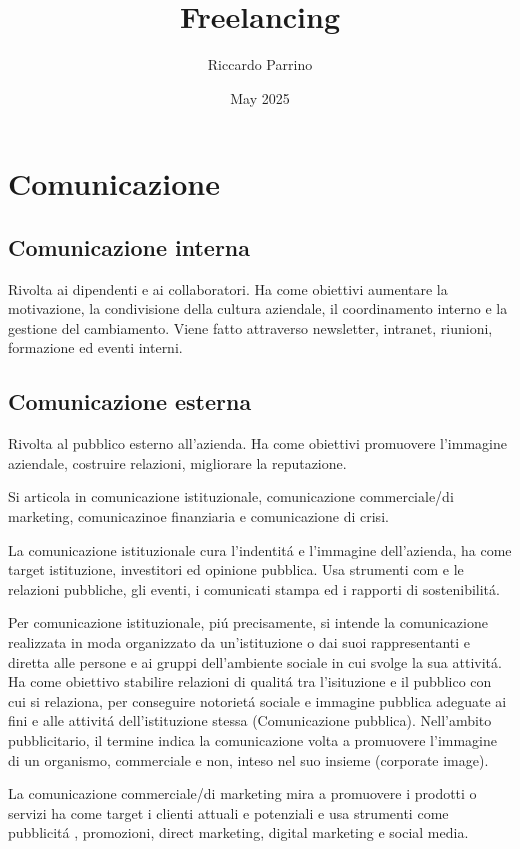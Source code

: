 \documentclass{article}
\title{Freelancing}
\author{Riccardo Parrino}
\date{May 2025}
\begin{document}
\maketitle

\section{Comunicazione}

\subsection{Comunicazione interna}
Rivolta ai dipendenti e ai collaboratori. Ha come obiettivi aumentare la motivazione, la condivisione della cultura aziendale, il coordinamento interno e la gestione del cambiamento. Viene fatto attraverso newsletter, intranet, riunioni, formazione ed eventi interni.

\subsection{Comunicazione esterna}
Rivolta al pubblico esterno all'azienda. Ha come obiettivi promuovere l'immagine aziendale, costruire relazioni, migliorare la reputazione.

Si articola in comunicazione istituzionale, comunicazione commerciale/di marketing, comunicazinoe finanziaria e comunicazione di crisi.

La comunicazione istituzionale cura l'indentit\'a e l'immagine dell'azienda,  ha come target istituzione, investitori ed opinione pubblica. Usa strumenti com e le relazioni pubbliche, gli eventi, i comunicati stampa ed i rapporti di sostenibilit\'a.

Per comunicazione istituzionale, pi\'u precisamente, si intende la comunicazione realizzata in moda organizzato da un'istituzione o dai suoi rappresentanti e diretta alle persone e ai gruppi dell'ambiente sociale in cui svolge la sua attivit\'a. Ha come obiettivo stabilire relazioni di qualit\'a tra l'isituzione e il pubblico con cui si relaziona, per conseguire notoriet\'a sociale e immagine pubblica adeguate ai fini e alle attivit\'a dell'istituzione stessa (Comunicazione pubblica). Nell'ambito pubblicitario, il termine indica la comunicazione volta a promuovere l'immagine di un organismo, commerciale e non, inteso nel suo insieme (corporate image).

La comunicazione commerciale/di marketing mira a promuovere i prodotti o servizi ha come target i clienti attuali e potenziali e usa strumenti come pubblicit\'a , promozioni, direct marketing, digital marketing e social media.
\end{document}

